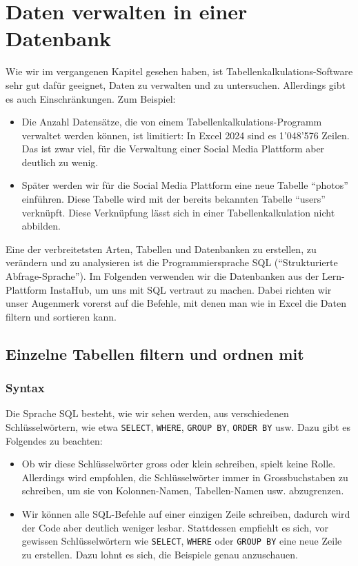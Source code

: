\section{Daten verwalten in einer Datenbank}
Wie wir im vergangenen Kapitel gesehen haben, ist Tabellenkalkulations-Software sehr gut dafür geeignet, Daten zu verwalten und zu untersuchen. Allerdings gibt es auch Einschränkungen. Zum Beispiel:
\begin{itemize}
  \item Die Anzahl Datensätze, die von einem Tabellenkalkulations-Programm verwaltet werden können, ist limitiert: In Excel 2024 sind es 1'048'576 Zeilen. Das ist zwar viel, für die Verwaltung einer Social Media Plattform aber deutlich zu wenig.
  \item Später werden wir für die Social Media Plattform eine neue Tabelle \enquote{photos} einführen. Diese Tabelle wird mit der bereits bekannten Tabelle \enquote{users} verknüpft. Diese Verknüpfung lässt sich in einer Tabellenkalkulation nicht abbilden.
\end{itemize}

Eine der verbreitetsten Arten, Tabellen und Datenbanken zu erstellen, zu verändern und zu analysieren ist die Programmiersprache \gls{SQL} (\enquote{Strukturierte Abfrage-Sprache}).
Im Folgenden verwenden wir die Datenbanken aus der Lern-Plattform InstaHub, um uns mit \gls{SQL} vertraut zu machen. Dabei richten wir unser Augenmerk vorerst auf die Befehle, mit denen man wie in Excel die Daten filtern und sortieren kann.

\subsection{Einzelne Tabellen filtern und ordnen mit \texorpdfstring{}{SQL}}

\lstset{style=sql}

\subsubsection*{Syntax}
Die Sprache \acrfull{SQL} besteht, wie wir sehen werden, aus verschiedenen Schlüsselwörtern, wie etwa \lstinline|SELECT|, \lstinline|WHERE|, \lstinline|GROUP BY|, \lstinline|ORDER BY| usw. Dazu gibt es Folgendes zu beachten:
\begin{itemize}
  \item Ob wir diese Schlüsselwörter gross oder klein schreiben, spielt keine Rolle. Allerdings wird empfohlen, die Schlüsselwörter immer in Grossbuchstaben zu schreiben, um sie von Kolonnen-Namen, Tabellen-Namen usw. abzugrenzen.
  \item Wir können alle \gls{SQL}-Befehle auf einer einzigen Zeile schreiben, dadurch wird der Code aber deutlich weniger lesbar. Stattdessen empfiehlt es sich, vor gewissen Schlüsselwörtern wie \lstinline|SELECT|, \lstinline|WHERE| oder \lstinline|GROUP BY| eine neue Zeile zu erstellen. Dazu lohnt es sich, die Beispiele genau anzuschauen.
\end{itemize}

